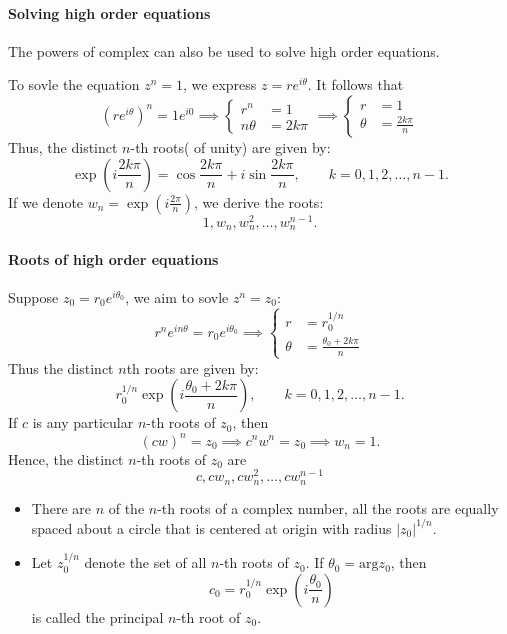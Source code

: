 \paragraph{Solving high order equations}The powers of complex can also be used to solve high order equations.
\begin{example}
To sovle the equation $z^n=1$, we express $z = re^{i\theta}$. It follows that
\[
(re^{i\theta})^n = 1e^{i0}\implies
\left\{
\begin{aligned}
r^n&=1\\
n\theta&=2k\pi
\end{aligned}\right.
\implies
\left\{
\begin{aligned}
r&=1\\
\theta&=\frac{2k\pi}{n}
\end{aligned}\right.
\]
Thus, the distinct $n$-th roots( of unity) are given by:
\[
\exp(i\frac{2k\pi}{n}) = \cos\frac{2k\pi}{n} + i\sin\frac{2k\pi}{n},\qquad
k=0,1,2,\dots,n-1.
\]
If we denote $w_n=\exp(i\frac{2\pi}{n})$, we derive the roots:
\[
1,w_n,w_n^2,\dots,w_n^{n-1}.
\]
\end{example}
\paragraph{Roots of high order equations}
Suppose $z_0=r_0e^{i\theta_0}$, we aim to sovle $z^n = z_0$:
\[
r^ne^{in\theta} = r_0e^{i\theta_0}\implies
\left\{
\begin{aligned}
r&=r_0^{1/n}\\
\theta&=\frac{\theta_0+2k\pi}{n}
\end{aligned}
\right.
\]
Thus the distinct $n$th roots are given by:
\[
r_0^{1/n}\exp(i\frac{\theta_0+2k\pi}{n}),\qquad
k=0,1,2,\dots,n-1.
\]
If $c$ is any particular $n$-th roots of $z_0$, then
\[
(cw)^n=z_0\implies
c^nw^n=z_0\implies w_n=1.
\]
Hence, the distinct $n$-th roots of $z_0$ are
\[
c,cw_n,cw_n^2,\dots,cw_n^{n-1}
\]
\begin{remark}
\begin{itemize}
\item
There are $n$ of the $n$-th roots of a complex number, all the roots are equally spaced about a circle that is centered at origin with radius $|z_0|^{1/n}$.
\item
Let $z_0^{1/n}$ denote the set of all $n$-th roots of $z_0$. If $\theta_0=\mbox{arg}z_0$, then
\[
c_0=r_0^{1/n}\exp(i\frac{\theta_0}{n})
\]
is called the principal $n$-th root of $z_0$.
\end{itemize}

\end{remark}


